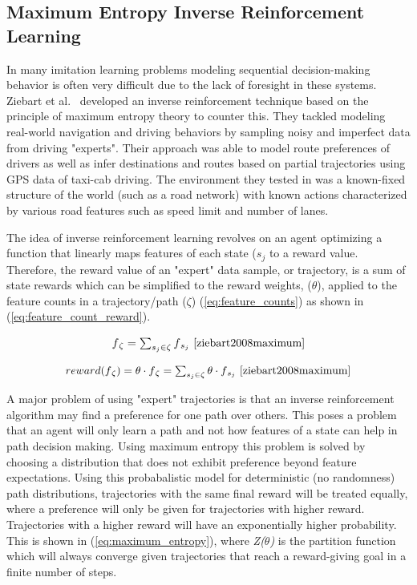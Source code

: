 \documentclass[12pt,american]{report}
\providecommand{\DIFaddend}{} %
\DeclareRobustCommand{\DIFaddend}{\DIFOaddend \let\includegraphics\DIFOincludegraphics} %
\begin{document}
\DIFaddend \subsection{Maximum Entropy Inverse Reinforcement Learning}
\label{sec:maxentirl}
In many imitation learning problems modeling sequential decision-making behavior is often very difficult due to the lack of foresight in these systems. Ziebart et al.~\cite{ziebart2008maximum} developed an inverse reinforcement technique based on the principle of maximum entropy theory to counter this.  They tackled modeling real-world navigation and driving behaviors by sampling noisy and imperfect data from driving "experts".  Their approach was able to model route preferences of drivers as well as infer destinations and routes based on partial trajectories using GPS data of taxi-cab driving.  The environment they tested in was a known-fixed structure of the world (such as a road network) with known actions characterized by various road features such as speed limit and number of lanes.

The idea of inverse reinforcement learning revolves on an agent optimizing a function that linearly maps features of each state (\textit{$s_j$} to a reward value. Therefore, the reward value of an "expert" data sample, or trajectory, is a sum of state rewards which can be simplified to the reward weights, (\textit{$\theta$}), applied to the feature counts in a trajectory/path ($\zeta$) (\ref{eq:feature_counts}) as shown in (\ref{eq:feature_count_reward}).

\begin{equation}
            \label{eq:feature_counts}
            \resizebox{0.20\textwidth}{!}{$f\textsubscript{$\zeta$}= \sum_{s_j\in\zeta}^{}f\textsubscript{$s_j$}$}~\cite{ziebart2008maximum}%
        \end{equation}

\begin{equation}
            \label{eq:feature_count_reward}
            \resizebox{0.44\textwidth}{!}{$reward(f\textsubscript{$\zeta$})= \theta \cdot f\textsubscript{$\zeta$} = \sum_{s_j\in\zeta}^{}\theta \cdot f\textsubscript{$s_j$}$}~\cite{ziebart2008maximum}
        \end{equation}

A major problem of using "expert" trajectories is that an inverse reinforcement algorithm may find a preference for one path over others.  This poses a problem that an agent will only learn a path and not how features of a state can help in path decision making.  Using maximum entropy this problem is solved by choosing a distribution that does not exhibit preference beyond feature expectations.  Using this probabalistic model for deterministic (no randomness) path distributions, trajectories with the same final reward will be treated equally, where a preference will only be given for trajectories with higher reward.  Trajectories with a higher reward will have an exponentially higher probability. This is shown in (\ref{eq:maximum_entropy}), where \textit{Z($\theta$)} is the partition function which will always converge given trajectories that reach a reward-giving goal in a finite number of steps.
\end{document}
